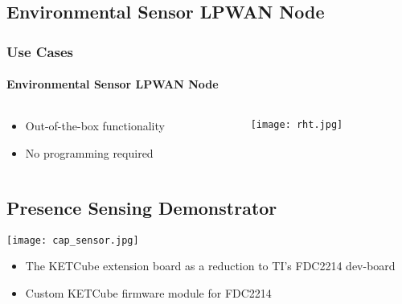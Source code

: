 \subsection{Environmental Sensor LPWAN Node}
\begin{frame}%
  \frametitle{Use Cases}
  \framesubtitle{Environmental Sensor LPWAN Node}
  \centering
        
\begin{columns}
      \begin{column}{0.5\paperwidth}
         \centering
         \begin{itemize}
           \item Out-of-the-box functionality
           \item No programming required
         \end{itemize}
      \end{column}
      \begin{column}{0.5\paperwidth}
         \centering
           \texttt{[image: rht.jpg]}
       \end{column}
    \end{columns}
  
\end{frame}

\subsection{Presence Sensing Demonstrator}
\begin{frame}%
  \centering
        
        
        
    \texttt{[image: cap\_sensor.jpg]}
  
   \begin{itemize}
           \item The KETCube extension board as a reduction to TI's FDC2214 dev-board
           \item Custom KETCube firmware module for FDC2214
   \end{itemize}
  
\end{frame}

  




  



